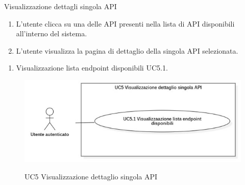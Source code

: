 \begin{usecase}{5}{Visualizzazione dettagli singola API}\label{uc:visualizzazione-dettagli-singola-api}

    \usecasemain{}
        \begin{enumerate}
            \item L'utente clicca su una delle API presenti nella lista di API disponibili all'interno del sistema.
            \item L'utente visualizza la pagina di dettaglio della singola API selezionata.
        \end{enumerate}

        \begin{enumerate}
            \item Visualizzazione lista endpoint disponibili UC5.1.
        \end{enumerate}

\end{usecase}

\begin{figure}[!ht] 
    \centering 
    \includegraphics[width=\columnwidth, alt={Caso d'uso relativo alla visualizzazione del dettaglio di una singola API}]{images/usecase/UC5.jpg}
    \caption{UC5 Visualizzazione dettaglio singola API}\label{fig:uc:visualizzazione-dettaglio-singola-api}
  \end{figure}

  \pagebreak

